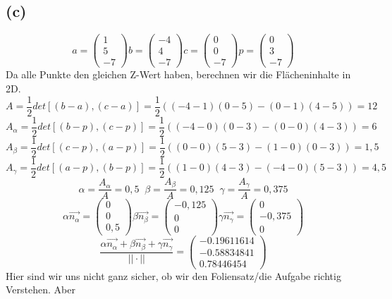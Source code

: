 \documentclass{article}
\begin{document}
\subsection*{(c)}
\[
a=\begin{pmatrix}
1\\5\\-7
\end{pmatrix}
b=\begin{pmatrix}
-4\\4\\-7
\end{pmatrix}
c=\begin{pmatrix}
0\\0\\-7
\end{pmatrix}
p=\begin{pmatrix}
0\\3\\-7
\end{pmatrix}
\]
Da alle Punkte den gleichen Z-Wert haben, berechnen wir die Flächeninhalte in 2D.
\[
A=\frac{1}{2}det[(b-a),(c-a)]=\frac{1}{2}((-4-1)(0-5)-(0-1)(4-5))=12
\]
\[
A_{\alpha}=\frac{1}{2}det[(b-p),(c-p)]=\frac{1}{2}((-4-0)(0-3)-(0-0)(4-3))=6
\]
\[
A_{\beta}=\frac{1}{2}det[(c-p),(a-p)]=\frac{1}{2}((0-0)(5-3)-(1-0)(0-3))=1,5
\]
\[
A_{\gamma}=\frac{1}{2}det[(a-p),(b-p)]=\frac{1}{2}((1-0)(4-3)-(-4-0)(5-3))=4,5
\]
\[
\alpha = \frac{A_{\alpha}}{A}= 0,5 \;\; \beta = \frac{A_{\beta}}{A}= 0,125 \;\; \gamma = \frac{A_{\gamma}}{A}= 0,375
\]
\[
\alpha\overrightarrow{n_{\alpha}}=
\begin{pmatrix}
0\\0\\0,5
\end{pmatrix}
\beta\overrightarrow{n_{\beta}}=
\begin{pmatrix}
-0,125\\0\\0
\end{pmatrix}
\gamma\overrightarrow{n_{\gamma}}=
\begin{pmatrix}
0\\-0,375\\0
\end{pmatrix}
\]
\[
\frac{\alpha\overrightarrow{n_{\alpha}}+\beta\overrightarrow{n_{\beta}}+\gamma\overrightarrow{n_{\gamma}}}{||\cdot||}=
\begin{pmatrix}
-0.19611614 \\ -0.58834841 \\ 0.78446454
\end{pmatrix}\]
Hier sind wir uns nicht ganz sicher, ob wir den Foliensatz/die Aufgabe richtig Verstehen. Aber 
\end{document}
